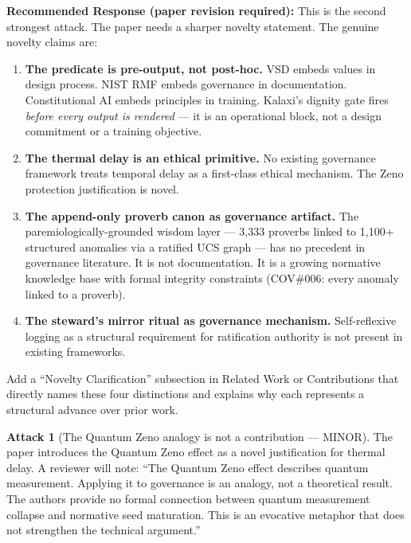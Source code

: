 \documentclass[12pt,a4paper]{article}
\theoremstyle{definition}
\newtheorem{attack}{Attack}[section]
\begin{document}
\begin{mdframed}[style=defenseframe]
\textbf{Recommended Response (paper revision required):}
This is the second strongest attack. The paper needs a sharper novelty statement.
The genuine novelty claims are:

\begin{enumerate}
\item \textbf{The predicate is pre-output, not post-hoc.} VSD embeds values in
  design process. NIST RMF embeds governance in documentation. Constitutional AI
  embeds principles in training. Kalaxi's dignity gate fires \emph{before every
  output is rendered} — it is an operational block, not a design commitment or a
  training objective.

\item \textbf{The thermal delay is an ethical primitive.} No existing governance
  framework treats temporal delay as a first-class ethical mechanism. The Zeno
  protection justification is novel.

\item \textbf{The append-only proverb canon as governance artifact.} The
  paremiologically-grounded wisdom layer — 3,333 proverbs linked to 1,100+
  structured anomalies via a ratified UCS graph — has no precedent in governance
  literature. It is not documentation. It is a growing normative knowledge base
  with formal integrity constraints (COV\#006: every anomaly linked to a proverb).

\item \textbf{The steward's mirror ritual as governance mechanism.} Self-reflexive
  logging as a structural requirement for ratification authority is not present in
  existing frameworks.
\end{enumerate}

Add a ``Novelty Clarification'' subsection in Related Work or Contributions that
directly names these four distinctions and explains why each represents a structural
advance over prior work.
\end{mdframed}

\begin{attack}[The Quantum Zeno analogy is not a contribution — MINOR]
\label{att:zeno}
The paper introduces the Quantum Zeno effect as a novel justification for thermal
delay. A reviewer will note: ``The Quantum Zeno effect describes quantum measurement.
Applying it to governance is an analogy, not a theoretical result. The authors
provide no formal connection between quantum measurement collapse and normative
seed maturation. This is an evocative metaphor that does not strengthen the
technical argument.''
\end{attack}
\end{document}

